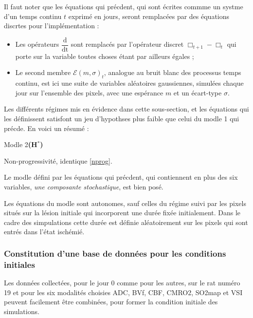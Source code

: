 \etoile
Il faut noter que les \'equations qui pr\'ecdent, qui sont \'ecrites commme un systme d'un temps continu $t$ exprim\'e en jours, %
seront remplac\'ees par des \'equations discrtes pour l'impl\'ementation :
\begin{itemize}
\item Les op\'erateurs $\dfrac{\text{d}}{\text{dt}}$ sont remplac\'es par l'op\'erateur discret $\Box_{t+1}-\Box_t$ %
qui porte sur la variable toutes choses \'etant par ailleurs \'egales ;
\item Le second membre $\mathcal{E}(m,\sigma)_t$, analogue au bruit blanc des processus  temps continu, %
est ici une suite de variables al\'eatoires gaussiennes, simul\'ees chaque jour sur l'ensemble des pixels, avec une esp\'erance $m$ et un \'ecart-type $\sigma$.
\end{itemize}

\ligneinter
Les diff\'erents r\'egimes mis en \'evidence dans cette sous-section, et les \'equations qui les d\'efinissent satisfont %
un jeu d'hypothses plus faible que celui du modle 1 qui pr\'ecde. En voici un r\'esum\'e :

\begin{modmerate}{Modle 2}{\textbf{(H${}^{\ast}$\arabic*)}}
\item Non-progressivit\'e, identique  \ref{nprog}.
\item\label{var_compf} Le modle d\'efini par les \'equations qui pr\'ecdent, %
qui contiennent en plus des six variables, \emph{une composante stochastique}, est bien pos\'e.
\item\label{autof} Les \'equations du modle sont autonomes, sauf celles du r\'egime suivi par les pixels situ\'es sur la l\'esion initiale %
qui incorporent une dur\'ee fix\'ee initialement. %
Dans le cadre des simpulations cette dur\'ee est d\'efinie al\'eatoirement sur les pixels qui sont entr\'es dans l'\'etat isch\'emi\'e.
\end{modmerate}

\newpage
\subsubsection{Constitution d'une base de donn\'ees pour les conditions initiales}

Les donn\'ees collect\'ees, pour le jour 0 comme pour les autres, sur le rat num\'ero 19 %
et pour les six modalit\'es choisies ADC, BVf, CBF, CMRO2, SO2map et VSI peuvent facilement \^etre combin\'ees, %
pour former la condition initiale des simulations.


